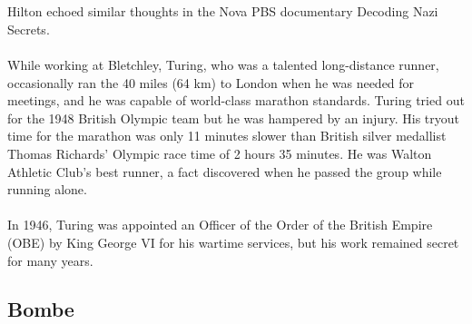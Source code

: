 \documentclass{article}
\begin{document}
\\\\
Hilton echoed similar thoughts in the Nova PBS documentary Decoding Nazi Secrets.
\\\\
While working at Bletchley, Turing, who was a talented long-distance runner, occasionally ran the 40 miles (64 km) to London when he was needed for meetings, and he was capable of world-class marathon standards. Turing tried out for the 1948 British Olympic team but he was hampered by an injury. His tryout time for the marathon was only 11 minutes slower than British silver medallist Thomas Richards' Olympic race time of 2 hours 35 minutes. He was Walton Athletic Club's best runner, a fact discovered when he passed the group while running alone.
\\\\
In 1946, Turing was appointed an Officer of the Order of the British Empire (OBE) by King George VI for his wartime services, but his work remained secret for many years.

\subsection{Bombe}
\end{document}
